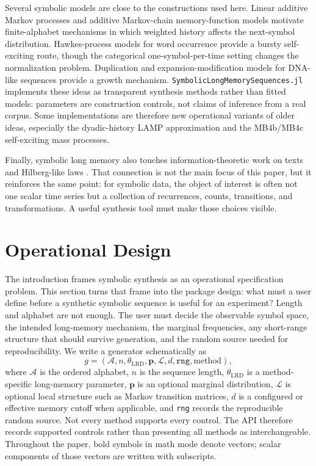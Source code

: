 \documentclass[journal]{IEEEtran}
\newcommand{\code}[1]{\texttt{#1}}
\newcommand{\pkg}[1]{\texttt{#1}}
\newcommand{\vect}[1]{\boldsymbol{#1}}
\newcommand{\sfive}{\pkg{SymbolicLongMemorySequences.jl}}
\begin{document}
Several symbolic models are close to the constructions used here.  Linear
additive Markov processes \cite{kumar2017_linear} and additive Markov-chain
memory-function models
\cite{melnyk2006_memory,mayzelis2006_additive,melnik2014_entropy} motivate
finite-alphabet mechanisms in which weighted history affects the next-symbol
distribution.  Hawkes-process models for word occurrence \cite{ogura2022_modeling}
provide a bursty self-exciting route, though the categorical one-symbol-per-time
setting changes the normalization problem.  Duplication and
expansion-modification models for DNA-like sequences
\cite{li1994_understanding,koroteev2015_duplication,salgado2012_exact} provide
a growth mechanism.  \sfive{} implements these ideas as transparent synthesis
methods rather than fitted models: parameters are construction controls, not
claims of inference from a real corpus.  Some implementations are therefore new
operational variants of older ideas, especially the dyadic-history LAMP
approximation and the MB4b/MB4c self-exciting mass processes.

Finally, symbolic long memory also touches information-theoretic work on texts
and Hilberg-like laws \cite{debowski2015_hilberg}.  That connection is not the
main focus of this paper, but it reinforces the same point: for symbolic data,
the object of interest is often not one scalar time series but a collection of
recurrences, counts, transitions, and transformations.  A useful synthesis tool
must make those choices visible.

\section{Operational Design}

The introduction frames symbolic synthesis as an operational specification
problem.  This section turns that frame into the package design: what must a user
define before a synthetic symbolic sequence is useful for an experiment?  Length
and alphabet are not enough.  The user must decide the
observable symbol space, the intended long-memory mechanism, the marginal
frequencies, any short-range structure that should survive generation, and the
random source needed for reproducibility.  We write a generator schematically as
\begin{equation}
  g =
  (\mathcal{A}, n, \theta_{\mathrm{LRD}}, \vect{p}, \mathcal{L}, d,
   \code{rng}, \text{method}),
\end{equation}
where \(\mathcal{A}\) is the ordered alphabet, \(n\) is the sequence length,
\(\theta_{\mathrm{LRD}}\) is a method-specific long-memory parameter,
\(\vect{p}\) is an optional marginal distribution, \(\mathcal{L}\) is optional
local structure such as Markov transition matrices, \(d\) is a configured or
effective memory cutoff when applicable, and \code{rng} records the reproducible
random source.  Not every method supports every control.  The API therefore
records supported controls rather than presenting all methods as interchangeable.
Throughout the paper, bold symbols in math mode denote vectors; scalar
components of those vectors are written with subscripts.
\end{document}
